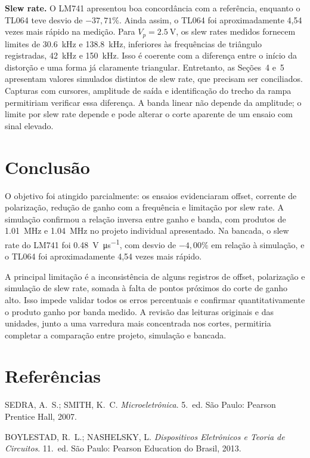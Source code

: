 \documentclass[11pt,a4paper]{article}
\begin{document}
\textbf{Slew rate.} O LM741 apresentou boa concordância com a referência, enquanto o TL064 teve desvio de $-37,71\%$. Ainda assim, o TL064 foi aproximadamente 4,54 vezes mais rápido na medição. Para $V_p = \SI{2,5}{\volt}$, os slew rates medidos fornecem limites de \SI{30,6}{\kilo\hertz} e \SI{138,8}{\kilo\hertz}, inferiores às frequências de triângulo registradas, \SI{42}{\kilo\hertz} e \SI{150}{\kilo\hertz}. Isso é coerente com a diferença entre o início da distorção e uma forma já claramente triangular. Entretanto, as Seções~4 e~5 apresentam valores simulados distintos de slew rate, que precisam ser conciliados. Capturas com cursores, amplitude de saída e identificação do trecho da rampa permitiriam verificar essa diferença. A banda linear não depende da amplitude; o limite por slew rate depende e pode alterar o corte aparente de um ensaio com sinal elevado.

\section{Conclusão}

O objetivo foi atingido parcialmente: os ensaios evidenciaram offset, corrente de polarização, redução de ganho com a frequência e limitação por slew rate. A simulação confirmou a relação inversa entre ganho e banda, com produtos de \SI{1,01}{\mega\hertz} e \SI{1,04}{\mega\hertz} no projeto individual apresentado. Na bancada, o slew rate do LM741 foi \SI{0,48}{\volt\per\micro\second}, com desvio de $-4,00\%$ em relação à simulação, e o TL064 foi aproximadamente 4,54 vezes mais rápido.

A principal limitação é a inconsistência de alguns registros de offset, polarização e simulação de slew rate, somada à falta de pontos próximos do corte de ganho alto. Isso impede validar todos os erros percentuais e confirmar quantitativamente o produto ganho por banda medido. A revisão das leituras originais e das unidades, junto a uma varredura mais concentrada nos cortes, permitiria completar a comparação entre projeto, simulação e bancada.

\section{Referências}

\begin{referencias}
\item SEDRA, A.~S.; SMITH, K.~C. \emph{Microeletrônica}. 5.~ed. São Paulo: Pearson
      Prentice Hall, 2007.
\item BOYLESTAD, R.~L.; NASHELSKY, L. \emph{Dispositivos Eletrônicos e Teoria de
      Circuitos}. 11.~ed. São Paulo: Pearson Education do Brasil, 2013.
\end{referencias}
\end{document}
